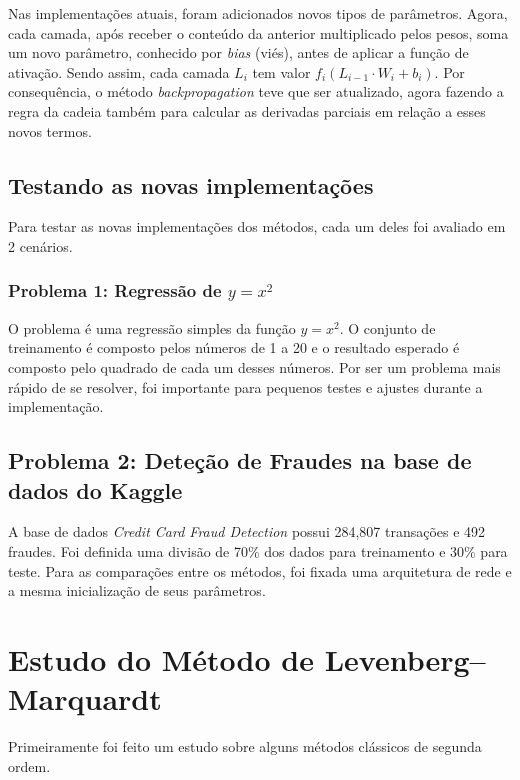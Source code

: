 \documentclass[11pt]{article}
\begin{document}
\begin{itemize}
\noindent
Nas implementações atuais, foram adicionados novos tipos de parâmetros. Agora, cada camada, após receber o conteúdo da anterior multiplicado pelos pesos, soma um novo parâmetro, conhecido por \textit{bias} (viés), antes de aplicar a função de ativação. Sendo assim, cada camada $L_i$ tem valor $f_i(L_{i-1} \cdot W_i + b_i)$. Por consequência, o método \textit{backpropagation} teve que ser atualizado, agora fazendo a regra da cadeia também para calcular as derivadas parciais em relação a esses novos termos.


\subsection*{Testando as novas implementações}
Para testar as novas implementações dos métodos, cada um deles foi avaliado em 2 cenários.
\subsubsection*{Problema 1: Regressão de $y = x^2$}
O problema é uma regressão simples da função $y = x^2$. O conjunto de treinamento é composto pelos números de 1 a 20 e o resultado esperado é composto pelo quadrado de cada um desses números. Por ser um problema mais rápido de se resolver, foi importante para pequenos testes e ajustes durante a implementação.

\subsection*{Problema 2: Deteção de Fraudes na base de dados do Kaggle}
A base de dados \textit{Credit Card Fraud Detection} possui  284,807 transações e 492 fraudes. Foi definida uma divisão de 70\% dos dados para treinamento e 30\% para teste. Para as comparações entre os métodos, foi fixada uma arquitetura de rede e a mesma inicialização de seus parâmetros.



\end{itemize}   


\section{Estudo do Método de Levenberg–Marquardt}
Primeiramente foi feito um estudo sobre alguns métodos clássicos de segunda ordem.
\end{document}
